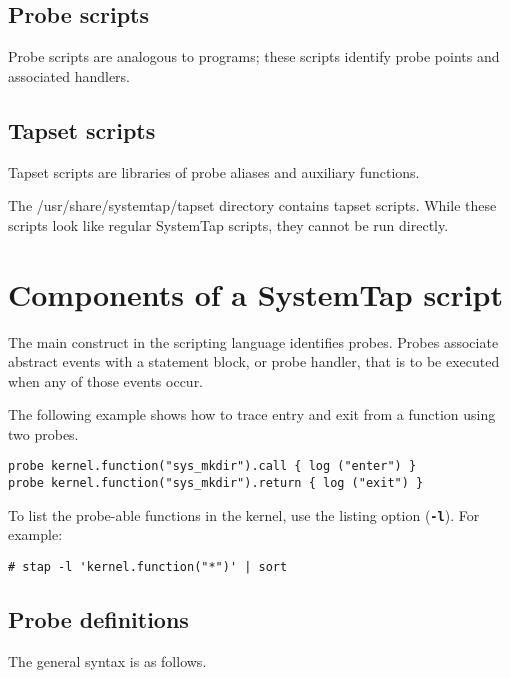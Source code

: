 \documentclass[twoside,english]{article}
\newenvironment{vindent}
{\begin{list}{}{\setlength{\listparindent}{6pt}}
\item[]}
{\end{list}}
\begin{document}
\subsection{Probe scripts}

Probe scripts are analogous to programs; these scripts identify probe points
and associated handlers.

\subsection{Tapset scripts}

Tapset scripts are libraries of probe aliases and auxiliary functions.

The /usr/share/systemtap/tapset directory contains tapset scripts. While
these scripts look like regular SystemTap scripts, they cannot be run directly.

\section{Components of a SystemTap script}

The main construct in the scripting language identifies probes. Probes associate
abstract events with a statement block, or probe handler, that is to be executed
when any of those events occur.

The following example shows how to trace entry and exit from a function using
two probes.

\begin{vindent}
\begin{verbatim}
probe kernel.function("sys_mkdir").call { log ("enter") }
probe kernel.function("sys_mkdir").return { log ("exit") }
\end{verbatim}
\end{vindent}

To list the probe-able functions in the kernel, use the listing option
(\texttt{\textbf{-l}}).  For example:

\begin{vindent}
\begin{verbatim}
# stap -l 'kernel.function("*")' | sort
\end{verbatim}
\end{vindent}

\subsection{Probe definitions}

The general syntax is as follows.
\end{document}
